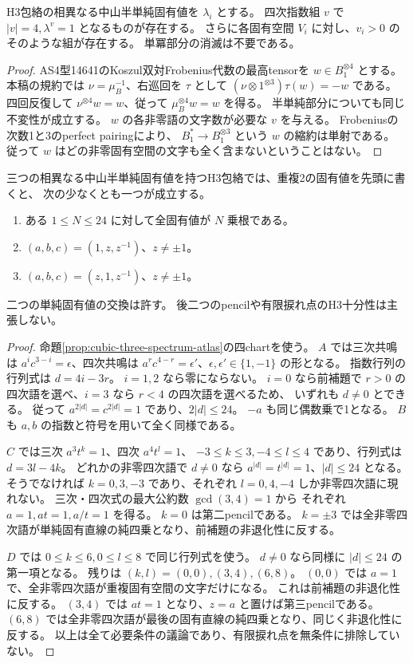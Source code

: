 \begin{lemma}[四次topによる追加スペクトル条件]
\label{lem:cubic-quartic-spectral-support}
H3包絡の相異なる中山半単純固有値を $\lambda_i$ とする。
四次指数組 $v$ で $|v|=4,\lambda^v=1$ となるものが存在する。
さらに各固有空間 $V_i$ に対し、$v_i>0$ のそのような組が存在する。
単冪部分の消滅は不要である。
\end{lemma}
\begin{proof}
AS4型14641のKoszul双対Frobenius代数の最高tensorを $w\in B_1^{\otimes4}$ とする。
本稿の規約では $\nu=\mu_B^{-1}$、右巡回を $\tau$ として
$(\nu\otimes1^{\otimes3})\tau(w)=-w$ である。
四回反復して $\nu^{\otimes4}w=w$、従って $\mu_B^{\otimes4}w=w$ を得る。
半単純部分についても同じ不変性が成立する。
$w$ の各非零語の文字数が必要な $v$ を与える。
Frobeniusの次数1と3のperfect pairingにより、
$B_1^*\to B_1^{\otimes3}$ という $w$ の縮約は単射である。
従って $w$ はどの非零固有空間の文字も全く含まないということはない。
\end{proof}

\begin{theorem}[三固有値スペクトルの有限捩れ部分と二つの残余pencil]
\label{thm:cubic-three-spectrum-torsion-pencil}
三つの相異なる中山半単純固有値を持つH3包絡では、重複2の固有値を先頭に書くと、
次の少なくとも一つが成立する。
\begin{enumerate}
\item ある $1\le N\le24$ に対して全固有値が $N$ 乗根である。
\item $(a,b,c)=(1,z,z^{-1})$、$z\ne\pm1$。
\item $(a,b,c)=(z,1,z^{-1})$、$z\ne\pm1$。
\end{enumerate}
二つの単純固有値の交換は許す。
後二つのpencilや有限捩れ点のH3十分性は主張しない。
\end{theorem}
\begin{proof}
命題\ref{prop:cubic-three-spectrum-atlas}の四chartを使う。
$A$ では三次共鳴は $a^ic^{3-i}=\epsilon$、四次共鳴は
$a^rc^{4-r}=\epsilon'$、$\epsilon,\epsilon'\in\{1,-1\}$ の形となる。
指数行列の行列式は $d=4i-3r$。
$i=1,2$ なら零にならない。
$i=0$ なら前補題で $r>0$ の四次語を選べ、$i=3$ なら $r<4$ の四次語を選べるため、
いずれも $d\ne0$ とできる。
従って $a^{2|d|}=c^{2|d|}=1$ であり、$2|d|\le24$。
$-a$ も同じ偶数乗で1となる。
$B$ も $a,b$ の指数と符号を用いて全く同様である。

$C$ では三次 $a^3t^k=1$、四次 $a^4t^l=1$、
$-3\le k\le3,-4\le l\le4$ であり、行列式は $d=3l-4k$。
どれかの非零四次語で $d\ne0$ なら $a^{|d|}=t^{|d|}=1$、$|d|\le24$ となる。
そうでなければ $k=0,3,-3$ であり、それぞれ $l=0,4,-4$ しか非零四次語に現れない。
三次・四次式の最大公約数 $\gcd(3,4)=1$ から
それぞれ $a=1,at=1,a/t=1$ を得る。
$k=0$ は第二pencilである。
$k=\pm3$ では全非零四次語が単純固有直線の純四乗となり、前補題の非退化性に反する。

$D$ では $0\le k\le6,0\le l\le8$ で同じ行列式を使う。
$d\ne0$ なら同様に $|d|\le24$ の第一項となる。
残りは $(k,l)=(0,0),(3,4),(6,8)$。
$(0,0)$ では $a=1$ で、全非零四次語が重複固有空間の文字だけになる。
これは前補題の非退化性に反する。
$(3,4)$ では $at=1$ となり、$z=a$ と置けば第三pencilである。
$(6,8)$ では全非零四次語が最後の固有直線の純四乗となり、同じく非退化性に反する。
以上は全て必要条件の議論であり、有限捩れ点を無条件に排除していない。
\end{proof}
